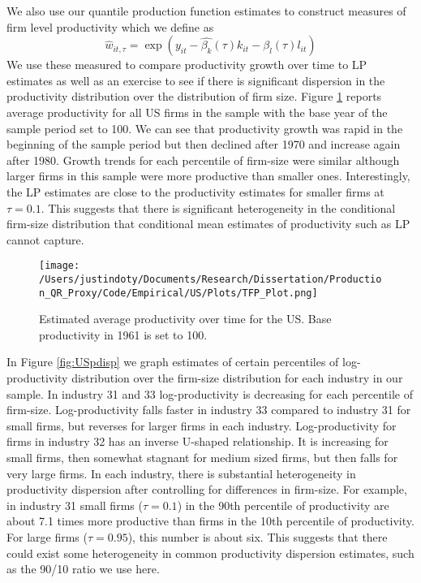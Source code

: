 \documentclass[11pt]{article}
\begin{document}


We also use our quantile production function estimates to construct measures of firm level productivity which we define as
\begin{equation}
\hat{w}_{it,\tau}=\exp(y_{it}-\hat{\beta_{k}}(\tau)k_{it}-\hat{\beta_{l}}(\tau)l_{it})
\end{equation}
We use these measured to compare productivity growth over time to LP estimates as well as an exercise to see if there is significant dispersion in the productivity distribution over the distribution of firm size. Figure \ref{fig:USpgrowth} reports average productivity for all US firms in the sample with the base year of the sample period set to 100. We can see that productivity growth was rapid in the beginning of the sample period but then declined after 1970 and increase again after 1980. Growth trends for each percentile of firm-size were similar although larger firms in this sample were more productive than smaller ones. Interestingly, the LP estimates are close to the productivity estimates for smaller firms at $\tau=0.1$. This suggests that there is significant heterogeneity in the conditional firm-size distribution that conditional mean estimates of productivity such as LP cannot capture.


\begin{figure}[H]
\centering
\texttt{[image: /Users/justindoty/Documents/Research/Dissertation/Production\_QR\_Proxy/Code/Empirical/US/Plots/TFP\_Plot.png]}
\caption{Estimated average productivity over time for the US. Base productivity in 1961 is set to 100.}
\label{fig:USpgrowth}
\end{figure}

In Figure \ref{fig:USpdisp} we graph estimates of certain percentiles of log-productivity distribution over the firm-size distribution for each industry in our sample. In industry 31 and 33 log-productivity is decreasing for each percentile of firm-size. Log-productivity falls faster in industry 33 compared to industry 31 for small firms, but reverses for larger firms in each industry. Log-productivity for firms in industry 32 has an inverse U-shaped relationship. It is increasing for small firms, then somewhat stagnant for medium sized firms, but then falls for very large firms. In each industry, there is substantial heterogeneity in productivity dispersion after controlling for differences in firm-size. For example, in industry 31 small firms ($\tau=0.1$) in the 90th percentile of productivity are about 7.1 times more productive than firms in the 10th percentile of productivity. For large firms ($\tau=0.95$), this number is about six. This suggests that there could exist some heterogeneity in common productivity dispersion estimates, such as the 90/10 ratio we use here.
\end{document}
